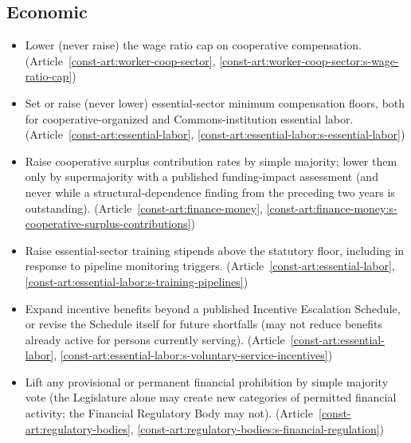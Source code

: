 \documentclass[11pt]{article}
\begin{document}
\subsection{Economic}
\begin{itemize}
  \item Lower (never raise) the wage ratio cap on cooperative compensation. (Article~\ref{const-art:worker-coop-sector}, \ref{const-art:worker-coop-sector:s-wage-ratio-cap})
  \item Set or raise (never lower) essential-sector minimum compensation floors, both for cooperative-organized and Commons-institution essential labor. (Article~\ref{const-art:essential-labor}, \ref{const-art:essential-labor:s-essential-labor})
  \item Raise cooperative surplus contribution rates by simple majority; lower them only by supermajority with a published funding-impact assessment (and never while a structural-dependence finding from the preceding two years is outstanding). (Article~\ref{const-art:finance-money}, \ref{const-art:finance-money:s-cooperative-surplus-contributions})
  \item Raise essential-sector training stipends above the statutory floor, including in response to pipeline monitoring triggers. (Article~\ref{const-art:essential-labor}, \ref{const-art:essential-labor:s-training-pipelines})
  \item Expand incentive benefits beyond a published Incentive Escalation Schedule, or revise the Schedule itself for future shortfalls (may not reduce benefits already active for persons currently serving). (Article~\ref{const-art:essential-labor}, \ref{const-art:essential-labor:s-voluntary-service-incentives})
  \item Lift any provisional or permanent financial prohibition by simple majority vote (the Legislature alone may create new categories of permitted financial activity; the Financial Regulatory Body may not). (Article~\ref{const-art:regulatory-bodies}, \ref{const-art:regulatory-bodies:s-financial-regulation})
\end{itemize}
\end{document}
